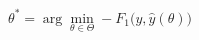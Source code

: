 \documentclass[preview]{standalone}
\begin{document}
\begin{align*}
\theta^* = \arg\min_{\theta \in \Theta} -F_{1}\bigl(y,\hat y(\theta)\bigr)
\end{align*}
\end{document}
